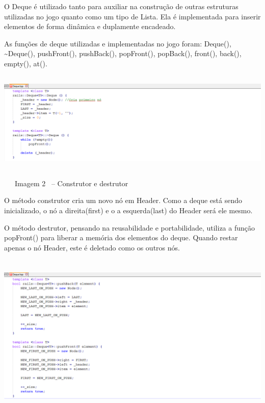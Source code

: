 \documentclass[a4paper]{article}
\begin{document}
\bigskip

{\color{black}
\textcolor[rgb]{0.13333334,0.13333334,0.13333334}{O Deque é utilizado
tanto para auxiliar na construção de outras estruturas utilizadas no
jogo quanto como um tipo de Lista. Ela é implementada para inserir
elementos de forma dinâmica e duplamente encadeado. }}

{\color{black}
\textcolor[rgb]{0.13333334,0.13333334,0.13333334}{As funções de deque
utilizadas e implementadas no jogo foram: Deque(), \~{}Deque(),
pushFront(), pushBack(), popFront(), popBack(), front(), back(),
empty(), at().}}



\begin{center}
\includegraphics[width=6.2709in,height=1.9028in]{Tra1n-img/Tra1n-img3.png}
\end{center}
{\centering\color{black}
\textcolor[rgb]{0.13333334,0.13333334,0.13333334}{\ \ \ }Imagem 2 \ –
Construtor e destrutor
\par}


\bigskip

{\color{black}
\textcolor[rgb]{0.13333334,0.13333334,0.13333334}{O método construtor
cria um novo nó em Header. Como a deque está sendo inicializado, o nó a
direita(first) e o a esquerda(last) do Header será ele mesmo.
}\textcolor[rgb]{0.13333334,0.13333334,0.13333334}{\ }}

{\color{black}
\textcolor[rgb]{0.13333334,0.13333334,0.13333334}{O método destrutor,
pensando na reusabilidade e portabilidade, utiliza a função popFront()
para liberar a memória dos elementos do deque. Quando restar apenas o
nó Header, este é deletado como os outros nós.}}


\bigskip


\bigskip


\bigskip


\includegraphics[width=6.2709in,height=3.0972in]{Tra1n-img/Tra1n-img4.png}
\end{document}
